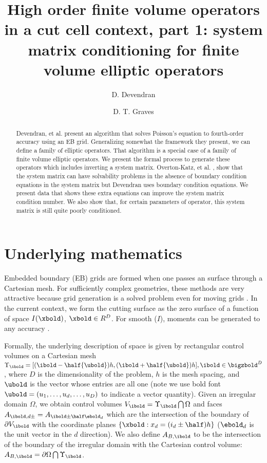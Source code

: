 \documentclass{article}
\begin{document}
\title{High order finite volume operators in a cut cell context,
  part 1: system  matrix conditioning for finite volume elliptic operators}
\author{
   \and D. Devendran    \footnotemark[2]
   \and D. T. Graves    \footnotemark[1]
        }

\maketitle

\begin{abstract}

Devendran, et al. \cite{Devendran2017} present an algorithm that
solves Poisson's equation to fourth-order accuracy using an EB grid.
Generalizing somewhat  the framework they present, we can define a
family of elliptic operators.   That algorithm is a special case of a
family of finite volume elliptic operators.   We present the formal
process to generate these operators which includes inverting a system
matrix.    Overton-Katz, et al. \cite{Katz2023}, show that the system
matrix can have solvability problems in the absence of boundary
condition equations in the system matrix  but Devendran uses
boundary condition equations.   We present data that shows these extra
equations can improve the system matrix condition number.
We also show that, for certain parameters of operator,
this system matrix is still quite poorly conditioned.


\end{abstract}


\section{Underlying mathematics}

Embedded boundary (EB) grids are formed when one passes an  surface
through a Cartesian mesh.    For sufficiently complex geometries, these methods
are very attractive because grid generation is a solved problem
even for moving grids \cite{MillerTrebotich2012}.
In the current context, we form the cutting surface as the zero
surface of a function  of space $I(\xbold)$, $\xbold \in R^D$.
For smooth ($I$),  moments can be generated to any
accuracy \cite{Schwartz2015}.

Formally, the underlying description of space
is given by rectangular control volumes on a Cartesian mesh
$\Upsilon_\ibold = [(\ibold-\half {\ubold})h, (\ibold+\half
{\ubold})h], \ibold \in \bigzbold^D$, where $D$ is the dimensionality
of the problem, $h$ is the mesh spacing, and ${\ubold}$ is the vector
whose entries are all one (note we use bold font $\ubold = (u_1, \dots, u_d,
\dots, u_D)$ to indicate a vector quantity).
Given an irregular domain $\Omega$, we
obtain control volumes $V_\ibold = \Upsilon_\ibold \bigcap \Omega$ and
faces $A_{\ibold,d\pm} = A_{\ibold \pm \half \ebold_d}$ which are the
intersection of the boundary of $\partial V_\ibold$ with the
coordinate planes $\{{\xbold}:x_d = (i_d \pm \half)h \}$ ($\ebold_d$ is
the unit vector in the $d$ direction).  We also
define $A_{B,\ibold}$ to be the intersection of the boundary of the
irregular domain with the Cartesian control volume: $A_{B,\ibold}
= \partial \Omega \bigcap \Upsilon_\ibold$. 
\end{document}
